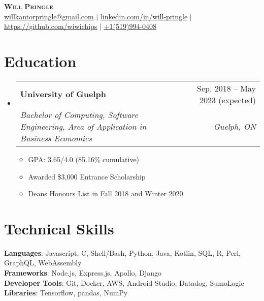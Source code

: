 \documentclass[letterpaper,11pt]{article}
\makeatletter
\newcommand{\resumeItem}[1]{
  \item\small{
    {#1 \vspace{-2pt}}
  }
}
\newcommand{\resumeSubheading}[4]{
  \vspace{-2pt}\item
    \begin{tabular*}{0.97\textwidth}[t]{l@{\extracolsep{\fill}}r}
      \textbf{#1} & #2 \\
      \textit{\small#3} & \textit{\small #4} \\
    \end{tabular*}\vspace{-7pt}
}
\newcommand{\resumeSubHeadingListStart}{\begin{itemize}[leftmargin=0.15in, label={}]}
\newcommand{\resumeSubHeadingListEnd}{\end{itemize}}
\newcommand{\resumeItemListStart}{\begin{itemize}}
\newcommand{\resumeItemListEnd}{\end{itemize}\vspace{-5pt}}
\makeatother
\begin{document}
\begin{center}
    \textbf{\Huge \scshape Will Pringle} \\ \vspace{1pt}
    \small \href{mailto:willkantorpringle@gmail.com}{\underline{willkantorpringle@gmail.com}} $|$ 
    \href{https://www.linkedin.com/in/will-pringle/}{\underline{linkedin.com/in/will-pringle}} $|$
    \href{https://github.com/wiwichips}{\underline{https://github.com/wiwichips}} $|$
    \href{tel:+15199940408}{\underline{+1(519)994-0408}}
\end{center}


\section{Education}
  \resumeSubHeadingListStart
    \resumeSubheading
      {University of Guelph}{Sep. 2018 -- May 2023 (expected)}
      {Bachelor of Computing, Software Engineering, Area of Application in Business Economics}{Guelph, ON}
      \resumeItemListStart
        \resumeItem{GPA: 3.65/4.0 (85.16\% cumulative)}
        \resumeItem{Awarded \$3,000 Entrance Scholarship}
        \resumeItem{Deans Honours List in Fall 2018 and Winter 2020}
      \resumeItemListEnd
  \resumeSubHeadingListEnd


\section{Technical Skills}
  \begin{itemize}[leftmargin=0.15in, label={}]
    \small{\item{
      \textbf{Languages}{: Javascript, C, Shell/Bash, Python, Java, Kotlin, SQL, R, Perl, GraphQL, WebAssembly} \\
      \textbf{Frameworks}{: Node.js, Express.js, Apollo, Django} \\
      \textbf{Developer Tools}{: Git, Docker, AWS, Android Studio, Datadog, SumoLogic} \\
      \textbf{Libraries}{: Tensorflow, pandas, NumPy} \\
    }}
  \end{itemize}


\end{document}
